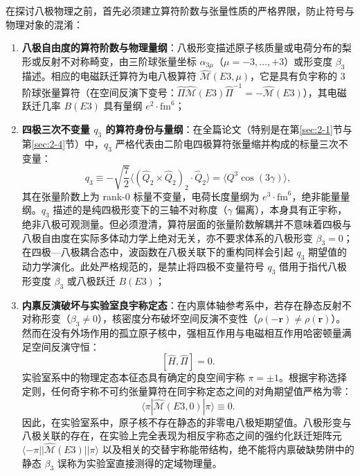 在探讨八极物理之前，首先必须建立算符阶数与张量性质的严格界限，防止符号与物理对象的混淆：
\begin{enumerate}
\item \textbf{八极自由度的算符阶数与物理量纲}：八极形变描述原子核质量或电荷分布的梨形或反射不对称畸变，由三阶球张量坐标 $\alpha_{3\mu}$（$\mu = -3, \dots, +3$）或形变度 $\beta_3$ 描述。相应的电磁跃迁算符为电八极算符 $\hat{\mathcal{M}}(E3, \mu)$，它是具有负宇称的 3 阶球张量算符（在空间反演下变号：$\hat{\Pi} \hat{\mathcal{M}}(E3) \hat{\Pi}^{-1} = -\hat{\mathcal{M}}(E3)$），其电磁跃迁几率 $B(E3)$ 具有量纲 $e^2\cdot\mathrm{fm}^6$；
\item \textbf{四极三次不变量 $q_3$ 的算符身份与量纲}：在全篇论文（特别是在第\ref{sec:2-1}节与第\ref{sec:2-4}节）中，$q_3$ 严格代表由二阶电四极算符张量缩并构成的标量三次不变量：
\begin{equation}\label{eq:3-7-q3-def}
q_3 \equiv -\sqrt{\frac{7}{2}} \langle (\hat{Q}_2 \times \hat{Q}_2)_2 \cdot \hat{Q}_2 \rangle = \langle Q^3 \cos(3\gamma) \rangle,
\end{equation}
其在张量阶数上为 rank-0 标量不变量，电荷长度量纲为 $e^3\cdot\mathrm{fm}^6$，绝非能量量纲。$q_3$ 描述的是纯四极形变下的三轴不对称度（$\gamma$ 偏离），本身具有正宇称，绝非八极可观测量。但必须澄清，算符层面的张量阶数解耦并不意味着四极与八极自由度在实际多体动力学上绝对无关，亦不要求体系的八极形变 $\beta_3 = 0$；在四极—八极耦合态中，波函数在八极关联下的重构同样会引起 $q_3$ 期望值的动力学演化。此处严格规范的，是禁止将四极不变量符号 $q_3$ 借用于指代八极形变度 $\beta_3$ 或八极跃迁 $B(E3)$；
\item \textbf{内禀反演破坏与实验室良宇称定态}：在内禀体轴参考系中，若存在静态反射不对称形变（$\beta_3 \ne 0$），核密度分布破坏空间反演不变性（$\rho(-\mathbf{r}) \ne \rho(\mathbf{r})$）。然而在没有外场作用的孤立原子核中，强相互作用与电磁相互作用哈密顿量满足空间反演守恒：
\begin{equation}\label{eq:3-7-H-parity-commute}
[\hat{H}, \hat{\Pi}] = 0.
\end{equation}
实验室系中的物理定态本征态具有确定的良空间宇称 $\pi = \pm 1$。根据宇称选择定则，任何奇宇称不可约张量算符在同宇称定态之间的对角期望值严格为零：
\begin{equation}\label{eq:3-7-E3-diag-zero}
\langle \pi | \hat{\mathcal{M}}(E3, 0) | \pi \rangle \equiv 0.
\end{equation}
因此，在实验室系中，原子核不存在静态的非零电八极矩期望值。八极形变与八极关联的存在，在实验上完全表现为相反宇称态之间的强约化跃迁矩阵元 $\langle -\pi || \hat{\mathcal{M}}(E3) || \pi \rangle$ 以及相关的交替宇称能带结构，绝不能将内禀破缺势阱中的静态 $\beta_3$ 误称为实验室直接测得的定域物理量。
\end{enumerate}

